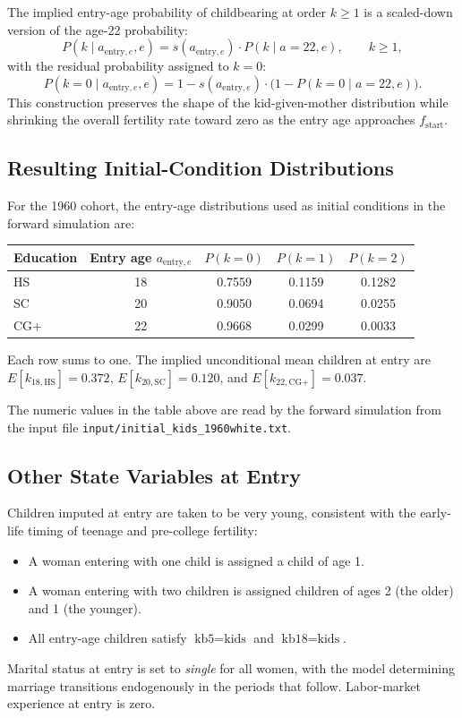 The implied entry-age probability of childbearing at order $k \geq 1$ is a scaled-down version of the age-22 probability:
\[
P(k \mid a_{\text{entry},e}, e) = s(a_{\text{entry},e}) \cdot P(k \mid a=22, e), \qquad k \geq 1,
\]
with the residual probability assigned to $k = 0$:
\[
P(k=0 \mid a_{\text{entry},e}, e) = 1 - s(a_{\text{entry},e}) \cdot \bigl(1 - P(k=0 \mid a=22, e)\bigr).
\]
This construction preserves the shape of the kid-given-mother distribution while shrinking the overall fertility rate toward zero as the entry age approaches $f_{\text{start}}$.

\subsection{Resulting Initial-Condition Distributions}

For the 1960 cohort, the entry-age distributions used as initial conditions in the forward simulation are:

\begin{center}
\begin{tabular}{lcccc}
\toprule
Education & Entry age $a_{\text{entry},e}$ & $P(k=0)$ & $P(k=1)$ & $P(k=2)$ \\
\midrule
HS  & 18 & 0.7559 & 0.1159 & 0.1282 \\
SC  & 20 & 0.9050 & 0.0694 & 0.0255 \\
CG+ & 22 & 0.9668 & 0.0299 & 0.0033 \\
\bottomrule
\end{tabular}
\end{center}

Each row sums to one. The implied unconditional mean children at entry are $E[k_{18,\text{HS}}] = 0.372$, $E[k_{20,\text{SC}}] = 0.120$, and $E[k_{22,\text{CG+}}] = 0.037$.

The numeric values in the table above are read by the forward simulation from the input file \texttt{input/initial\_kids\_1960white.txt}.

\subsection{Other State Variables at Entry}

Children imputed at entry are taken to be very young, consistent with the early-life timing of teenage and pre-college fertility:
\begin{itemize}
\item A woman entering with one child is assigned a child of age 1.
\item A woman entering with two children is assigned children of ages 2 (the older) and 1 (the younger).
\item All entry-age children satisfy $\text{kb5} = \text{kids}$ and $\text{kb18} = \text{kids}$.
\end{itemize}
Marital status at entry is set to \emph{single} for all women, with the model determining marriage transitions endogenously in the periods that follow. Labor-market experience at entry is zero.

